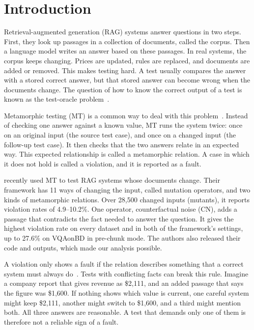 \documentclass[preprint,12pt,authoryear]{elsarticle}
\newcommand{\cn}{\textsc{CN}}
\begin{document}
\section{Introduction}
\label{sec:intro}

Retrieval-augmented generation (RAG) systems answer questions in two steps. First, they look up
passages in a collection of documents, called the corpus. Then a language model writes an answer
based on these passages. In real systems, the corpus keeps changing. Prices are updated, rules are
replaced, and documents are added or removed. This makes testing hard. A test usually compares the
answer with a stored correct answer, but that stored answer can become wrong when the documents
change. The question of how to know the correct output of a test is known as the test-oracle
problem~\citep{barr2015oracle}.

Metamorphic testing (MT) is a common way to deal with this problem~\citep{segura2016survey}. Instead
of checking one answer against a known value, MT runs the system twice: once on an original input
(the source test case), and once on a changed input (the follow-up test case). It then checks that
the two answers relate in an expected way. This expected relationship is called a metamorphic
relation. A case in which it does not hold is called a violation, and it is reported as a fault.

\citet{kim2026knowledge} recently used MT to test RAG systems whose documents change. Their framework
has 11 ways of changing the input, called mutation operators, and two kinds of metamorphic relations.
Over 28{,}500 changed inputs (mutants), it reports violation rates of 4.9--10.2\%. One operator,
counterfactual noise (\cn), adds a passage that contradicts the fact needed to answer the question.
It gives the highest violation rate on every dataset and in both of the framework's settings, up to
27.6\% on VQAonBD in pre-chunk mode. The authors also released their code and outputs, which made our
analysis possible.

A violation only shows a fault if the relation describes something that a correct system must always
do~\citep{segura2016survey}. Tests with conflicting facts can break this rule. Imagine a company
report that gives revenue as \$2,111, and an added passage that says the figure was \$1,600. If
nothing shows which value is current, one careful system might keep \$2,111, another might switch to
\$1,600, and a third might mention both. All three answers are reasonable. A test that demands only
one of them is therefore not a reliable sign of a fault.
\end{document}
